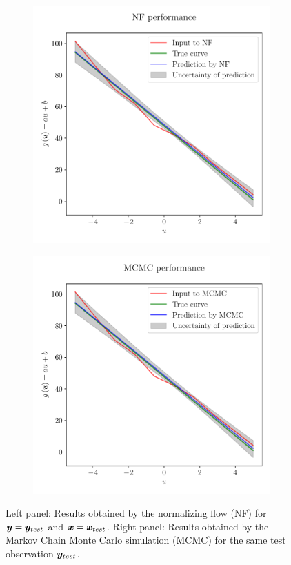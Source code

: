 \documentclass[a4paper,12pt]{report}
\begin{document}
\begin{figure}[h]
	\centering
	\begin{subfigure}[t]{0.49\textwidth}
	\centering
	\includegraphics[width=\textwidth]{figures/nf-linear-regression-example-nfperformance.pdf}
	\end{subfigure}
	\hfill
	\begin{subfigure}[t]{0.49\textwidth}
	\centering
	\includegraphics[width=\textwidth]{figures/nf-linear-regression-example-mcmcperformance.pdf}
	\end{subfigure}
\cprotect\caption{Left panel: Results obtained by the normalizing flow (NF) for $\bm{y} = \bm{y}_{test}$ and $\bm{x} = \bm{x}_{test}$. Right panel: Results obtained by the Markov Chain Monte Carlo simulation (MCMC) for the same test observation $\bm{y}_{test}$.}
\label{fig:nf-linear-regression-example-performance}
\end{figure}
\end{document}
